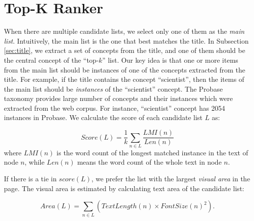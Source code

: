 \section{Top-K Ranker}
\label{sec:ranker}

When there are multiple candidate lists,
we select only one of them as the {\em main list}.
Intuitively, the main list is the one that best matches the title.
In Subsection \ref{sec:title}, we extract a set of concepts from
the title, and one of them should be the central concept of the ``top-$k$'' list.
Our key idea is that one or more items from the main list should be instances
of one of the concepts extracted from the title. For example, if the title
contains the concept ``scientist'', then the items of the main list should
be {\em instances} of the ``scientist'' concept. The Probase taxonomy provides
large number of concepts and their instances which were extracted from the
web corpus. For instance, ``scientist'' concept has 2054 instances in
Probase.
We calculate the score of each candidate list $L$ as:

\[Score(L)= \frac{1}{k} \sum_{n \in L} \frac{LMI(n)}{Len(n)}\]
where $LMI(n)$ is the word count of the longest matched
instance in the text of node $n$,
while $Len(n)$ means the word count of the whole text in node $n$.

If there is a tie in $score(L)$, we prefer the list with the largest
{\em visual area} in the page.
The visual area is estimated by calculating text area
of the candidate list:

\[Area(L)= \sum_{n \in L} (TextLength(n)\times FontSize(n)^2).\]

